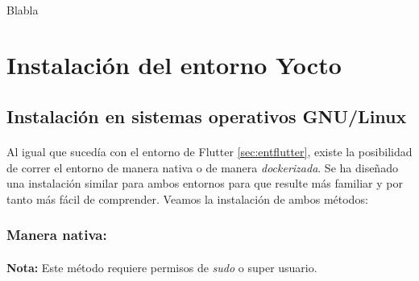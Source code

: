 \paragraph{}Blabla

\newpage

\section{Instalación del entorno Yocto}

\subsection{Instalación en sistemas operativos GNU/Linux}

\paragraph{}Al igual que sucedía con el entorno de Flutter \ref{sec:entflutter}, existe
la posibilidad de correr el entorno de manera nativa o de manera \emph{dockerizada}.
Se ha diseñado una instalación similar para ambos entornos para que resulte más familiar
y por tanto más fácil de comprender. Veamos la instalación de ambos métodos:

\subsubsection{Manera nativa:}

\paragraph{}\textbf{Nota:} Este método requiere permisos de \emph{sudo} o super usuario.

